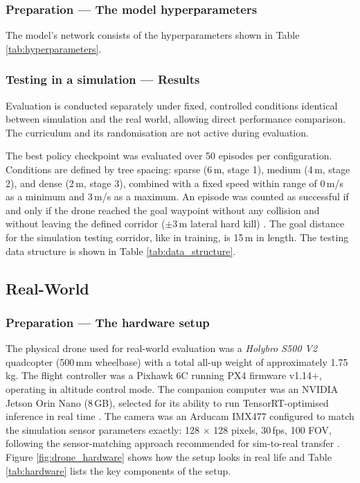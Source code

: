\documentclass[../main.tex]{subfiles}
\begin{document}
\subsubsection{Preparation --- The model hyperparameters}

The model's network consists of the hyperparameters shown in Table \ref{tab:hyperparameters}.



\subsubsection{Testing in a simulation --- Results}

Evaluation is conducted separately under fixed, controlled conditions identical between simulation and the real world, allowing direct performance comparison. The curriculum and its randomisation are not active during evaluation.

The best policy checkpoint was evaluated over 50 episodes per configuration. Conditions are defined by tree spacing: sparse (6\,m, stage 1), medium (4\,m, stage 2), and dense (2\,m, stage 3), combined with a fixed speed within range of 0\,m/s as a minimum and 3\,m/s as a maximum. An episode was counted as successful if and only if the drone reached the goal waypoint without any collision and without leaving the defined corridor ($\pm$3\,m lateral hard kill) \cite{Kabas2022}. The goal distance for the simulation testing corridor, like in training, is 15\,m in length. The testing data structure is shown in Table \ref{tab:data_structure}.



\subsection{Real-World}

\subsubsection{Preparation --- The hardware setup}

The physical drone used for real-world evaluation was a \textit{Holybro S500 V2} quadcopter (500\,mm wheelbase) with a total all-up weight of approximately 1.75\,kg. The flight controller was a Pixhawk 6C running PX4 firmware v1.14+, operating in altitude control mode. The companion computer was an NVIDIA Jetson Orin Nano (8\,GB), selected for its ability to run TensorRT-optimised inference in real time \cite{Kabas2022}. The camera was an Arducam IMX477 configured to match the simulation sensor parameters exactly: 128 $\times$ 128 pixels, 30\,fps, 100\textdegree{} FOV, following the sensor-matching approach recommended for sim-to-real transfer \cite{Zhao2020,Salvato2021}. Figure \ref{fig:drone_hardware} shows how the setup looks in real life and Table \ref{tab:hardware} lists the key components of the setup.
\end{document}
